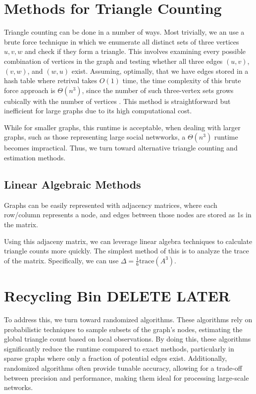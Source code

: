 \documentclass[12pt]{report}
\begin{document}
\section{Methods for Triangle Counting}

Triangle counting can be done in a number of ways.
Most trivially, we an use a brute force technique in which we enumerate all distinct sets of three vertices ${u, v, w}$ and check if they form a triangle.
This involves examining every possible combination of vertices in the graph and testing whether all three edges $(u, v)$, $(v, w)$, and $(w, u)$ exist.
Assuming, optimally, that we have edges stored in a hash table where retrival takes $O(1)$ time, the time complexity of this brute force approach is $\Theta(n^3)$, since the number of such three-vertex sets grows cubically with the number of vertices \cite{al_hasan_triangle_2018}.
This method is straightforward but inefficient for large graphs due to its high computational cost.

While for smaller graphs, this runtime is acceptable, when dealing with larger graphs, such as those representing large social netwworks, a $\Theta(n^3)$ runtime becomes impractical.
Thus, we turn toward alternative triangle counting and estimation methods.

\subsection{Linear Algebraic Methods}

Graphs can be easily represented with adjacency matrices, where each row/column represents a node, and edges between those nodes are stored as 1s in the matrix.

Using this adjaceny matrix, we can leverage linear algebra techniques to calculate triangle counts more quickly.
The simplest method of this is to analyze the trace of the matrix.
Specifically, we can use $\Delta = \frac{1}{6} \mathrm{trace}(A^3)$. 

\section{Recycling Bin DELETE LATER}

To address this, we turn toward randomized algorithms. These algorithms rely on probabilistic techniques to sample subsets of the graph's nodes, estimating the global triangle count based on local observations.
By doing this, these algorithms significantly reduce the runtime compared to exact methods, particularly in sparse graphs where only a fraction of potential edges exist.
Additionally, randomized algorithms often provide tunable accuracy, allowing for a trade-off between precision and performance, making them ideal for processing large-scale networks.

\newpage


\end{document}

